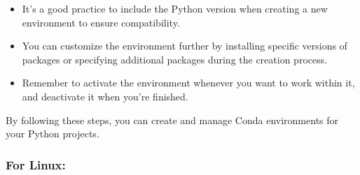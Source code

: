\documentclass[
  letterpaper,
  DIV=11,
  numbers=noendperiod]{scrreprt}
\providecommand{\tightlist}{%
  \setlength{\itemsep}{0pt}\setlength{\parskip}{0pt}}\usepackage{longtable,booktabs,array}
\begin{document}
\begin{enumerate}
  \begin{itemize}
  \tightlist
  \item
    It's a good practice to include the Python version when creating a
    new environment to ensure compatibility.
  \item
    You can customize the environment further by installing specific
    versions of packages or specifying additional packages during the
    creation process.
  \item
    Remember to activate the environment whenever you want to work
    within it, and deactivate it when you're finished.
  \end{itemize}

  By following these steps, you can create and manage Conda environments
  for your Python projects.
\end{enumerate}

\subsubsection{For Linux:}\label{for-linux}
\end{document}

